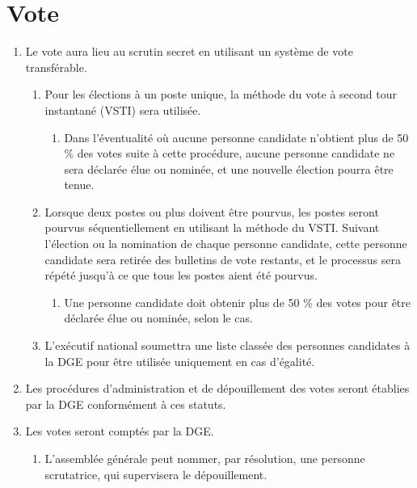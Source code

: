 \section{Vote}
\label{vote}

\begin{enumerate}
 \item Le vote aura lieu au scrutin secret en utilisant un système de vote transférable.
  \begin{enumerate}
   \item Pour les élections à un poste unique, la méthode du vote à second tour instantané (VSTI) sera utilisée.
    \begin{enumerate}
     \item Dans l'éventualité où aucune personne candidate n'obtient plus de 50 \% des votes suite à cette procédure, aucune personne candidate ne sera déclarée élue ou nominée, et une nouvelle élection pourra être tenue.
    \end{enumerate}
   \item Lorsque deux postes ou plus doivent être pourvus, les postes seront pourvus séquentiellement en utilisant la méthode du VSTI. Suivant l'élection ou la nomination de chaque personne candidate, cette personne candidate sera retirée des bulletins de vote restants, et le processus sera répété jusqu'à ce que tous les postes aient été pourvus.
    \begin{enumerate}
     \item Une personne candidate doit obtenir plus de 50 \% des votes pour être déclarée élue ou nominée, selon le cas.
    \end{enumerate}
   \item L'exécutif national soumettra une liste classée des personnes candidates à la DGE pour être utilisée uniquement en cas d'égalité.
  \end{enumerate}
 \item Les procédures d'administration et de dépouillement des votes seront établies par la DGE conformément à ces statuts.
 \item Les votes seront comptés par la DGE.
  \begin{enumerate}
   \item L'assemblée générale peut nommer, par résolution, une personne scrutatrice, qui supervisera le dépouillement.
  \end{enumerate}
\end{enumerate}
